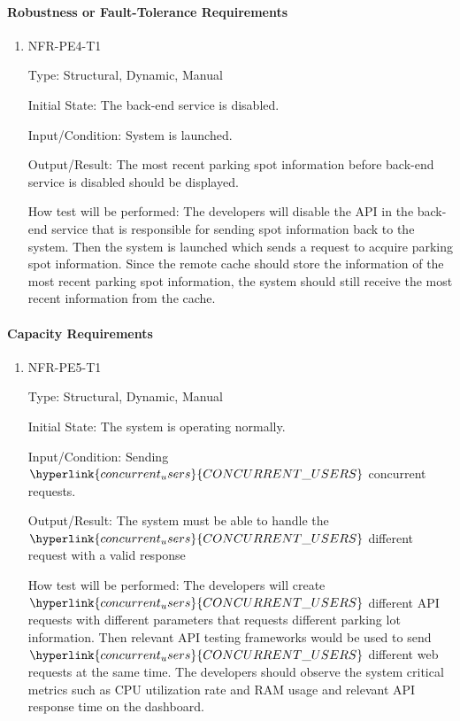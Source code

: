 \documentclass[12pt, titlepage]{article}
\begin{document}
\paragraph{Robustness or Fault-Tolerance Requirements}

\begin{enumerate}

\item{NFR-PE4-T1}

Type: Structural, Dynamic, Manual
					
Initial State: The back-end service is disabled.
					
Input/Condition: System is launched.
					
Output/Result: The most recent parking spot information before back-end service
is disabled should be displayed.
					
How test will be performed: The developers will disable the API in the back-end
service that is responsible for sending spot information back to the system.
Then the system is launched which sends a request to acquire parking spot
information. Since the remote cache should store the information of the most
recent parking spot information, the system should still receive the most recent
information from the cache.
					
\end{enumerate}

\paragraph{Capacity Requirements}

\begin{enumerate}

\item{NFR-PE5-T1}

Type: Structural, Dynamic, Manual
					
Initial State: The system is operating normally.
					
Input/Condition: Sending $\hyperlink{concurrent_users}{CONCURRENT\_USERS}$
concurrent requests.
					
Output/Result: The system must be able to handle the
$\hyperlink{concurrent_users}{CONCURRENT\_USERS}$ different request with a valid
response
					
How test will be performed: The developers will create
$\hyperlink{concurrent_users}{CONCURRENT\_USERS}$ different API requests with
different parameters that requests different parking lot information. Then
relevant API testing frameworks would be used to send
\\$\hyperlink{concurrent_users}{CONCURRENT\_USERS}$ different web requests at
the same time. The developers should observe the system critical metrics such as
CPU utilization rate and RAM usage and relevant API response time on the
dashboard.
					
\end{enumerate}
\end{document}
